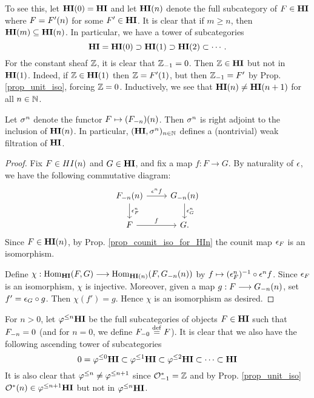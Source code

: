 To see this, let $\LHI[0]{\HI} = \HI$ and let $\LHI[n]{\HI}$ 
denote the full subcategory of $F \in \HI$ where $F = \LHI[n]{F'}$ 
for some $F' \in \HI$. It is clear that if $m \geq n$, then 
$\LHI[m]{\HI} \subseteq \LHI[n]{\HI}$. In particular, we have a 
tower of subcategories
\[
\HI = \LHI[0]{\HI} \supset \LHI[1]{\HI} \supset \LHI[2]{\HI} 
\subset \cdots.
\]
For the constant sheaf $\Z$, it is clear that $\RHI{\Z} = 0$. 
Then $\Z \in \HI$ but not in $\LHI{\HI}$. Indeed, if $\Z \in 
\LHI{\HI}$ then $\Z = \LHI{F'}$, but then $\RHI{\Z} = F'$ by Prop. 
\ref{prop_unit_iso}, forcing $\Z = 0$. Inductively, we see 
that $\LHI[n]{\HI} \neq \LHI[n + 1]{\HI}$ for all $n \in \N$.

\begin{prop}
Let $\sgHI{n}$ denote the functor $F \mapsto 
\LHI[n]{(\RHI[n]{F})}$. Then $\sgHI{n}$ is right adjoint to the 
inclusion of $\LHI[n]{\HI}$. In particular, $(\HI, \sgHI{n})_{n 
\in \N}$ defines a (nontrivial) weak filtration of $\HI$.
\end{prop}
\begin{proof}
Fix $F \in \LHI[n]{HI}$ and $G \in \HI$, and fix a map $f : 
F \to G$. By naturality of $\cuHI$, we have the following 
commutative diagram:
\[
\begin{tikzcd}
\LHI[n]{\RHI[n]{F}} \arrow{r}{\cuHI^n f}\arrow{d}{\cuHI^n_F} 
& \LHI[n]{\RHI[n]{G}} \arrow{d}{\cuHI^n_G} \\
F \arrow{r}{f}
& G.
\end{tikzcd}
\]
Since $F \in \LHI[n]{\HI}$, by Prop. \ref{prop_counit_iso_for_HIn} 
the counit map $\cuHI_F$ is an isomorphism.

Define $\chi: \homHI(F, G) \to \hom_{\LHI[n]{\HI}}(F, 
\LHI[n]{\RHI[n]{G}})$ by $f \mapsto (\cuHI^n_F)^{-1} \comp \cuHI^n 
f$. Since $\cuHI_F$ is an isomorphism, $\chi$ is injective. 
Moreover, given a map $g: F \to \LHI[n]{\RHI[n]{G}}$, set $f' = 
\cuHI_G \comp g$. Then $\chi(f') = g$. Hence $\chi$ is an 
isomorphism as desired.
\end{proof}

For $n > 0$, let $\tlHI{n}\HI$ be the full subcategories of 
objects $F \in \HI$ such that $\RHI[n]{F} = 0$ (and for $n = 0$, 
we define $\RHI[0]{F} \defeq F$). It is clear that we also have 
the following ascending tower of subcategories
\[
0 = \tlHI{0}\HI \subset \tlHI{1}\HI \subset \tlHI{2}\HI \subset 
   \cdots \subset \HI
\]
It is also clear that $\tlHI{n} \neq \tlHI{n + 1}$ since 
$\RHI{\Ox} = \Z$ and by Prop. \ref{prop_unit_iso} $\LHI[n]{\Ox} 
\in \tlHI{n + 1}\HI$ but not in $\tlHI{n}\HI$.

